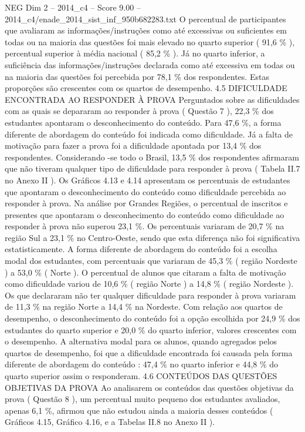 \begin{textsample}{NEG Dim 2 – 2014\_c4 – Score 9.00 – 2014\_c4/enade\_2014\_sist\_inf\_950b682283.txt}
O percentual de participantes que avaliaram as informações/instruções como até excessivas ou suficientes em todas ou na maioria das questões foi mais elevado no quarto superior ( 91,6 \% ), percentual superior à média nacional ( 85,2 \% ).
Já no quarto inferior, a suficiência das informações/instruções declarada como até excessiva em todas ou na maioria das questões foi percebida por 78,1 \% dos respondentes.
Estas proporções são crescentes com os quartos de desempenho. 4.5 DIFICULDADE ENCONTRADA AO RESPONDER À PROVA Perguntados sobre as dificuldades com as quais se depararam ao responder à prova ( Questão 7 ), 22,3 \% dos estudantes apontaram o desconhecimento do conteúdo.
Para 47,6 \%, a forma diferente de abordagem do conteúdo foi indicada como dificuldade.
Já a falta de motivação para fazer a prova foi a dificuldade apontada por 13,4 \% dos respondentes.
Considerando -se todo o Brasil, 13,5 \% dos respondentes afirmaram que não tiveram qualquer tipo de dificuldade para responder à prova ( Tabela II.7 no Anexo II ).
Os Gráficos 4.13 e 4.14 apresentam os percentuais de estudantes que apontaram o desconhecimento do conteúdo como dificuldade percebida ao responder à prova.
Na análise por Grandes Regiões, o percentual de inscritos e presentes que apontaram o desconhecimento do conteúdo como dificuldade ao responder à prova não superou 23,1 \%.
Os percentuais variaram de 20,7 \% na região Sul a 23,1 \% no Centro-Oeste, sendo que esta diferença não foi significativa estatisticamente.
A forma diferente de abordagem do conteúdo foi a escolha modal dos estudantes, com percentuais que variaram de 45,3 \% ( região Nordeste ) a 53,0 \% ( Norte ).
O percentual de alunos que citaram a falta de motivação como dificuldade variou de 10,6 \% ( região Norte ) a 14,8 \% ( região Nordeste ).
Os que declararam não ter qualquer dificuldade para responder à prova variaram de 11,3 \% na região Norte a 14,4 \% na Nordeste.
Com relação aos quartos de desempenho, o desconhecimento do conteúdo foi a opção escolhida por 24,9 \% dos estudantes do quarto superior e 20,0 \% do quarto inferior, valores crescentes com o desempenho.
A alternativa modal para os alunos, quando agregados pelos quartos de desempenho, foi que a dificuldade encontrada foi causada pela forma diferente de abordagem do conteúdo : 47,4 \% no quarto inferior e 44,8 \% do quarto superior assim o responderam. 4.6 CONTEÚDOS DAS QUESTÕES OBJETIVAS DA PROVA Ao analisarem os conteúdos das questões objetivas da prova ( Questão 8 ), um percentual muito pequeno dos estudantes avaliados, apenas 6,1 \%, afirmou que não estudou ainda a maioria desses conteúdos ( Gráficos 4.15, Gráfico 4.16, e a Tabelas II.8 no Anexo II ).

\end{textsample}
